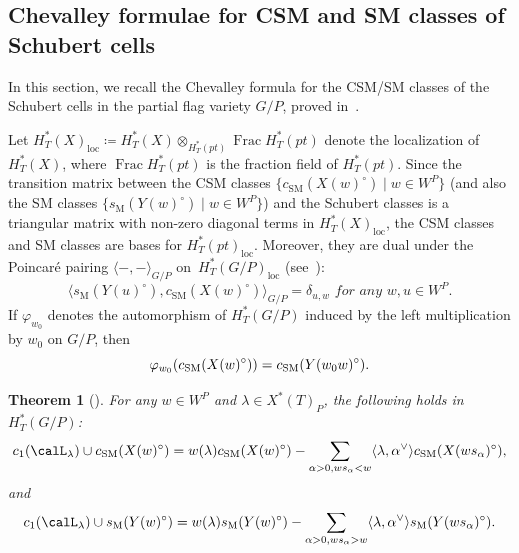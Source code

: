 \documentclass[11pt]{article}
\newtheorem{theorem}[theo]{Theorem}
\theoremstyle{definition}
\numberwithin{equation}{section}
\newcommand{\csm}{c_{\mathrm{SM}}}
\newcommand{\ssm}{s_{\mathrm{M}}}
\DeclareMathOperator{\Frac}{Frac}
\DeclareMathOperator{\loc}{loc}
\begin{document}
\subsection{Chevalley formulae for CSM and SM classes of Schubert cells}
In this section, we recall the Chevalley formula for the CSM/SM classes of the Schubert cells in the partial flag variety $G/P$,
proved in~\cite{AMSS:shadows,su:quantum}.


Let $H^*_T(X)_{\loc}\coloneqq H^*_T(X)\otimes_{H^*_T(pt)} \Frac H^*_T(pt)$ denote the localization of $H^*_T(X)$, where 
$\Frac H^*_T(pt)$ is the fraction field of $H^*_T(pt)$. Since the transition matrix between the CSM classes $\{\csm(X(w)^\circ)\mid w\in W^P\}$ (and also the SM classes \mbox{$\{\ssm(Y(w)^\circ)\mid w\in W^P\}$}) and the Schubert classes is a triangular matrix with non-zero diagonal terms in $H^*_T(X)_{\loc}$, the CSM classes and SM classes are bases for $H_T^*(pt)_{\loc}$. Moreover, they are dual under the Poincar\'e pairing $\langle-,-\rangle_{G/P}$ on~$H_T^*(G/P)_{\loc}$ (see~\cite[Theorem 7.1]{AMSS:shadows}):
	\begin{equation*}
		\langle \ssm(Y(u)^\circ), \csm(X(w)^\circ)\rangle_{G/P}=\delta_{u,w} \textit{ for any } w,u\in W^P.
\end{equation*}
If $\varphi_{w_0}$ denotes the automorphism of $H_T^*(G/P)$ induced by the left multiplication by $w_0$ on $G/P$,
then
\begin{equation}\label{equ:w0action}
	\varphi_{w_0}(\csm(X(w)^\circ))=\csm(Y(w_0w)^\circ) \/.
\end{equation}
\begin{theorem}[{\cite{AMSS:shadows,su:quantum}}]\label{thm:chevalley} 
	For any $w\in W^P$ and $\lambda\in X^*(T)_P$, the following holds in $H_T^*(G/P)$:
	\begin{equation*}\label{equ:ChePX}
		c_1(\calL_\lambda)\cup \csm (X(w)^\circ)=w(\lambda) \csm (X(w)^\circ)-\sum_{\alpha>0,ws_\alpha <w}\langle\lambda,\alpha^\vee\rangle \csm (X(ws_\alpha)^\circ),
	\end{equation*}
	and
	\begin{equation*}\label{equ:cheL}
		c_1(\calL_\lambda)\cup \ssm (Y(w)^\circ)=
		w(\lambda) \ssm (Y(w)^\circ)-\sum_{\alpha>0,ws_\alpha >w}\langle\lambda,\alpha^\vee\rangle {\ssm (Y(ws_\alpha)^\circ)} \/.
	\end{equation*}
\end{theorem}
\end{document}
